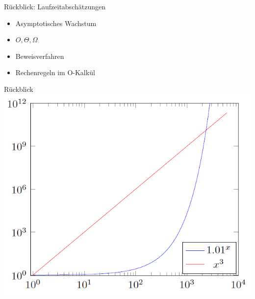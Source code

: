 





\graphicspath{{../figures/}}



\framePrevEpisode

\begin{frame}{Rückblick: Laufzeitabschätzungen}
	\begin{itemize}[<+->]
		\item Asymptotisches Wachstum
		\item $O, \Theta, \Omega$
		\item Beweisverfahren
		\item Rechenregeln im O-Kalkül
	\end{itemize}
\end{frame}

\begin{frame}{Rückblick}
	\centering
	\includegraphics[scale=0.5]{laufzeit/polyVsExp}
\end{frame}

